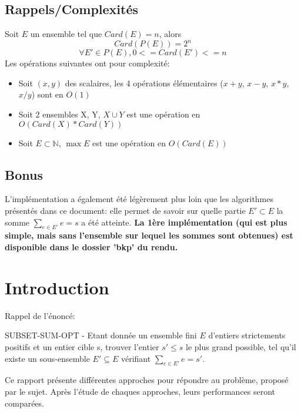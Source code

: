 \documentclass[10pt]{article}
\begin{document}
		\subsection*{Rappels/Complexités}
			Soit $E$ un ensemble tel que $Card(E) = n$, alors
			$$Card(P(E)) = 2^n$$
			$$\forall E' \in P(E) , 0 <= Card(E') <= n$$
			Les opérations suivantes ont pour complexité:
			\begin{itemize}[label=-]
				\setlength\itemsep{0.1em}
				\item Soit $(x, y)$ des scalaires, les 4 opérations élémentaires ($x+y$, $x-y$, $x*y$, $x/y$) sont en $O(1)$
				\item Soit 2 ensembles X, Y, $X \cup Y$ est une opération en $O(Card(X) * Card(Y))$
				\item Soit $E \subset \mathbb{N}$, $\max{E}$ est une opération en $O(Card(E))$
			\end{itemize}
			
		\subsection*{Bonus}\label{bonus}
				L'implémentation a également été légèrement plus loin que les algorithmes présentés dans ce document: elle permet
				de savoir sur quelle partie $E' \subset E$ la somme $\sum\limits_{e \in E'}e = s$ a été atteinte.
				\newline
				\newline
				\textbf{La 1ère implémentation (qui est plus simple, mais sans l'ensemble sur lequel les sommes sont obtenues)
				est disponible dans le dossier 'bkp' du rendu.}
				
	\section{Introduction}
		Rappel de l'énoncé:
		\newline
		\begin{addmargin}[2em]{0em}
			\label{problem}{
			SUBSET-SUM-OPT - Etant donnée un ensemble fini $E$ d'entiers
			strictements positifs et un entier cible s, trouver l'entier
			$s' \leq s$ le plus grand possible, tel qu'il existe un
			sous-ensemble $E' \subseteq E$ vérifiant $\sum_{e \in E'}{e} = s'$.
			}
			\newline
		\end{addmargin}
		Ce rapport présente différentes approches pour répondre au problème, proposé par le sujet.
		\newline
		Après l'étude de chaques approches, leurs performances seront comparées.
		
\end{document}
